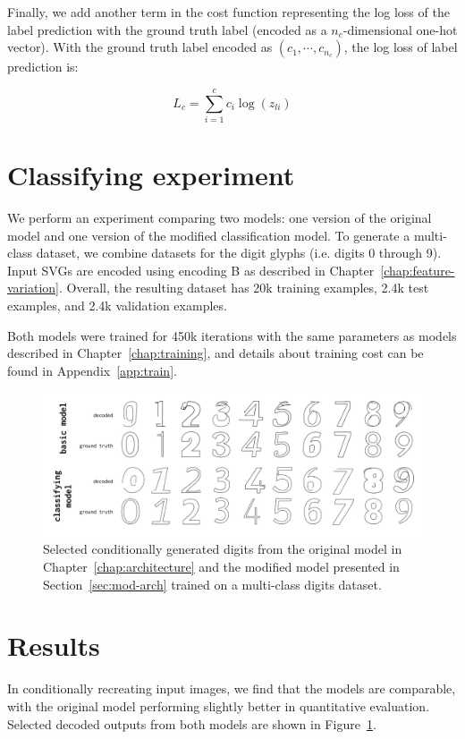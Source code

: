 Finally, we add another term in the cost function representing the log loss of the label prediction with the ground truth label (encoded as a $n_c$-dimensional one-hot vector).
With the ground truth label encoded as $(c_1, \cdots, c_{n_c})$, the log loss of label prediction is:

\begin{equation}
L_c = \sum_{i=1}^c c_i \log(z_{li})
\end{equation}

\section{Classifying experiment}
We perform an experiment comparing two models: one version of the original model and one version of the modified classification model.
To generate a multi-class dataset, we combine datasets for the digit glyphs (i.e. digits 0 through 9).
Input SVGs are encoded using encoding B as described in Chapter~\ref{chap:feature-variation}.
Overall, the resulting dataset has 20k training examples, 2.4k test examples, and 2.4k validation examples.

Both models were trained for 450k iterations with the same parameters as models described in Chapter~\ref{chap:training}, and details about training cost can be found in Appendix~\ref{app:train}.

\begin{figure}[h]
    \centering
	\includegraphics[width=\textwidth]{figures/digits}
    \caption[Visual results for the multi-class digits models]
    {Selected conditionally generated digits from the original model in Chapter~\ref{chap:architecture} and the modified model presented in Section~\ref{sec:mod-arch} trained on a multi-class digits dataset.\label{fig:class-results}}
\end{figure}

\section{Results}
In conditionally recreating input images, we find that the models are comparable, with the original model performing slightly better in quantitative evaluation. Selected decoded outputs from both models are shown in Figure~\ref{fig:class-results}.

